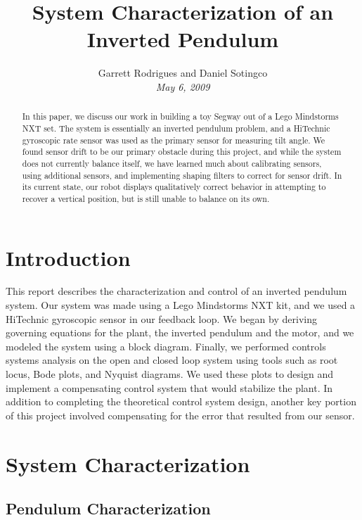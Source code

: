 \documentclass[onecolumn, draftclass]{IEEEtran} %
\begin{document}
\title{System Characterization of an Inverted Pendulum}
\author{Garrett Rodrigues and Daniel Sotingco
\\\emph{May 6, 2009}
}
\maketitle


\begin{abstract}
In this paper, we discuss our work in building a toy Segway out of a Lego Mindstorms NXT set.  The system is essentially an inverted pendulum problem, and a HiTechnic gyroscopic rate sensor was used as the primary sensor for measuring tilt angle.  We found sensor drift to be our primary obstacle during this project, and while the system does not currently balance itself, we have learned much about calibrating sensors, using additional sensors, and implementing shaping filters to correct for sensor drift.  In its current state, our robot displays qualitatively correct behavior in attempting to recover a vertical position, but is still unable to balance on its own.
\end{abstract}

\section{Introduction}
This report describes the characterization and control of an inverted pendulum system.  Our system was made using a Lego Mindstorms NXT kit, and we used a HiTechnic gyroscopic sensor in our feedback loop.  We began by deriving governing equations for the plant, the inverted pendulum and the motor, and we modeled the system using a block diagram.  Finally, we performed controls systems analysis on the open and closed loop system using tools such as root locus, Bode plots, and Nyquist diagrams.  We used these plots to design and implement a compensating control system that would stabilize the plant.  In addition to completing the theoretical control system design, another key portion of this project involved compensating for the error that resulted from our sensor.

\section{System Characterization}

\subsection{Pendulum Characterization}
\label{Theory}
\end{document}
